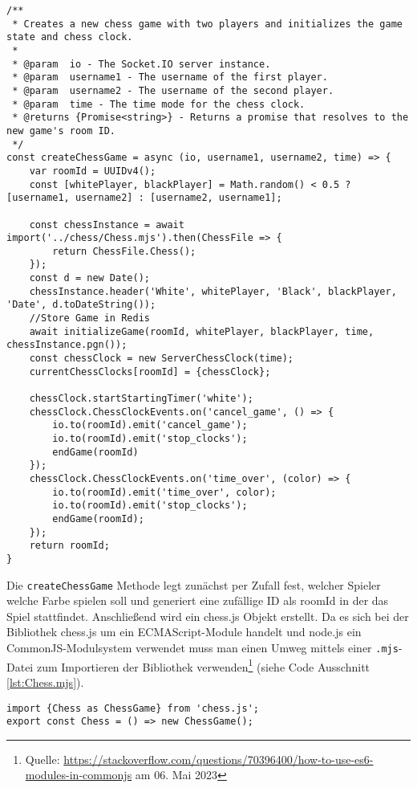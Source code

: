 \begin{lstlisting}[style=codeStyle, caption={Die createChessGame Methode zum Initialisieren einer Schachpartie}, label={lst:createChessGame}]
/**
 * Creates a new chess game with two players and initializes the game state and chess clock.
 *
 * @param  io - The Socket.IO server instance.
 * @param  username1 - The username of the first player.
 * @param  username2 - The username of the second player.
 * @param  time - The time mode for the chess clock.
 * @returns {Promise<string>} - Returns a promise that resolves to the new game's room ID.
 */
const createChessGame = async (io, username1, username2, time) => {
    var roomId = UUIDv4();
    const [whitePlayer, blackPlayer] = Math.random() < 0.5 ? [username1, username2] : [username2, username1];

    const chessInstance = await import('../chess/Chess.mjs').then(ChessFile => {
        return ChessFile.Chess();
    });
    const d = new Date();
    chessInstance.header('White', whitePlayer, 'Black', blackPlayer, 'Date', d.toDateString());
    //Store Game in Redis
    await initializeGame(roomId, whitePlayer, blackPlayer, time, chessInstance.pgn());
    const chessClock = new ServerChessClock(time);
    currentChessClocks[roomId] = {chessClock};

    chessClock.startStartingTimer('white');
    chessClock.ChessClockEvents.on('cancel_game', () => {
        io.to(roomId).emit('cancel_game');
        io.to(roomId).emit('stop_clocks');
        endGame(roomId)
    });
    chessClock.ChessClockEvents.on('time_over', (color) => {
        io.to(roomId).emit('time_over', color);
        io.to(roomId).emit('stop_clocks');
        endGame(roomId);
    });
    return roomId;
}
\end{lstlisting}

Die \verb|createChessGame| Methode legt zunächst per Zufall fest, welcher Spieler welche Farbe spielen soll und generiert eine zufällige ID als roomId in der das Spiel stattfindet. Anschließend wird ein chess.js Objekt erstellt. Da es sich bei der Bibliothek chess.js um ein ECMAScript-Module handelt und node.js ein CommonJS-Modulsystem verwendet muss man einen Umweg mittels einer \verb|.mjs|-Datei zum Importieren der Bibliothek verwenden\footnote{Quelle: \url{https://stackoverflow.com/questions/70396400/how-to-use-es6-modules-in-commonjs} am 06. Mai 2023} (siehe Code Ausschnitt \ref{lst:Chess.mjs}).

\begin{lstlisting}[style=codeStyle, caption={Die Chess.mjs Datei}, label={lst:Chess.mjs}]
import {Chess as ChessGame} from 'chess.js';
export const Chess = () => new ChessGame();
\end{lstlisting}

